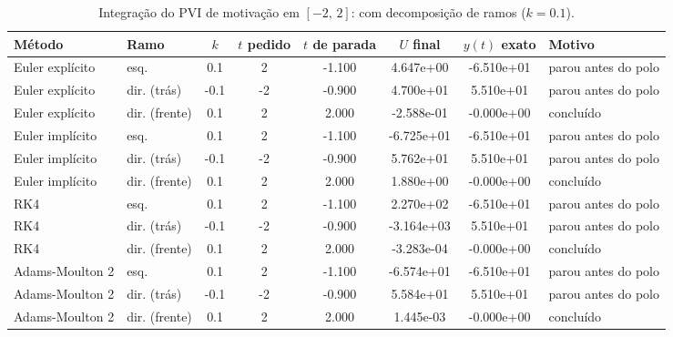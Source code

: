 \begin{table}[H]
    \centering
    \small
    \begin{tabular}{llcccccl}
        \hline
        Método & Ramo & $k$ & $t$ pedido & $t$ de parada & $U$ final & $y(t)$ exato & Motivo \\
        \hline
        Euler explícito & esq. & 0.1 & 2 & -1.100 & 4.647e+00 & -6.510e+01 & parou antes do polo \\
        Euler explícito & dir. (trás) & -0.1 & -2 & -0.900 & 4.700e+01 & 5.510e+01 & parou antes do polo \\
        Euler explícito & dir. (frente) & 0.1 & 2 & 2.000 & -2.588e-01 & -0.000e+00 & concluído \\
        Euler implícito & esq. & 0.1 & 2 & -1.100 & -6.725e+01 & -6.510e+01 & parou antes do polo \\
        Euler implícito & dir. (trás) & -0.1 & -2 & -0.900 & 5.762e+01 & 5.510e+01 & parou antes do polo \\
        Euler implícito & dir. (frente) & 0.1 & 2 & 2.000 & 1.880e+00 & -0.000e+00 & concluído \\
        RK4 & esq. & 0.1 & 2 & -1.100 & 2.270e+02 & -6.510e+01 & parou antes do polo \\
        RK4 & dir. (trás) & -0.1 & -2 & -0.900 & -3.164e+03 & 5.510e+01 & parou antes do polo \\
        RK4 & dir. (frente) & 0.1 & 2 & 2.000 & -3.283e-04 & -0.000e+00 & concluído \\
        Adams-Moulton 2 & esq. & 0.1 & 2 & -1.100 & -6.574e+01 & -6.510e+01 & parou antes do polo \\
        Adams-Moulton 2 & dir. (trás) & -0.1 & -2 & -0.900 & 5.584e+01 & 5.510e+01 & parou antes do polo \\
        Adams-Moulton 2 & dir. (frente) & 0.1 & 2 & 2.000 & 1.445e-03 & -0.000e+00 & concluído \\
        \hline
    \end{tabular}
    \caption{Integração do PVI de motivação em $[-2,\, 2]$: com decomposição de ramos ($k = 0.1$).}
    \label{tab:m2_2_com_decomposicao_ramos}
\end{table}
